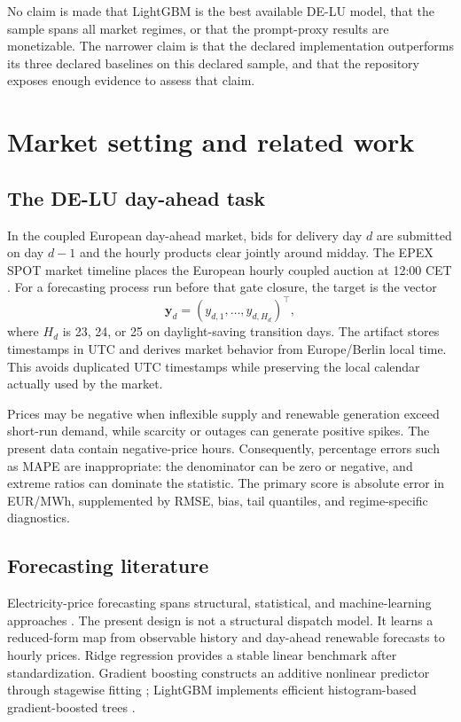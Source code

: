 \documentclass[11pt]{article}
\begin{document}
No claim is made that LightGBM is the best available DE-LU model, that the
sample spans all market regimes, or that the prompt-proxy results are
monetizable.  The narrower claim is that the declared implementation
outperforms its three declared baselines on this declared sample, and that the
repository exposes enough evidence to assess that claim.

\section{Market setting and related work}

\subsection{The DE-LU day-ahead task}

In the coupled European day-ahead market, bids for delivery day $d$ are
submitted on day $d-1$ and the hourly products clear jointly around midday.
The EPEX SPOT market timeline places the European hourly coupled auction at
12:00 CET \cite{epex2022}.  For a forecasting process run before that gate
closure, the target is the vector
\[
  \mathbf{y}_d=(y_{d,1},\ldots,y_{d,H_d})^\top,
\]
where $H_d$ is 23, 24, or 25 on daylight-saving transition days.  The artifact
stores timestamps in UTC and derives market behavior from Europe/Berlin local
time.  This avoids duplicated UTC timestamps while preserving the local
calendar actually used by the market.

Prices may be negative when inflexible supply and renewable generation exceed
short-run demand, while scarcity or outages can generate positive spikes.
The present data contain \NegativeShare{} negative-price hours.  Consequently,
percentage errors such as MAPE are inappropriate: the denominator can be zero
or negative, and extreme ratios can dominate the statistic.  The primary
score is absolute error in EUR/MWh, supplemented by RMSE, bias, tail
quantiles, and regime-specific diagnostics.

\subsection{Forecasting literature}

Electricity-price forecasting spans structural, statistical, and
machine-learning approaches \cite{weron2014}.  The present design is not a
structural dispatch model.  It learns a reduced-form map from observable
history and day-ahead renewable forecasts to hourly prices.  Ridge regression
\cite{hoerl1970} provides a stable linear benchmark after standardization.
Gradient boosting constructs an additive nonlinear predictor through
stagewise fitting \cite{friedman2001}; LightGBM implements efficient
histogram-based gradient-boosted trees \cite{ke2017}.
\end{document}
